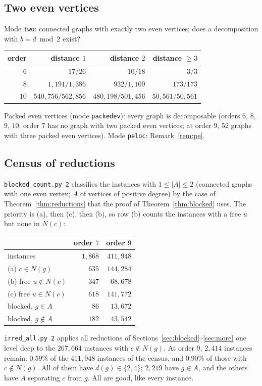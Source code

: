 \documentclass[11pt]{amsart}
\theoremstyle{definition}
\begin{document}
\subsection*{Two even vertices}
Mode \texttt{two}: connected graphs with exactly two even vertices; does a decomposition with
$b=d\bmod2$ exist?
\begin{center}
\begin{tabular}{rrrr}
\toprule
order & distance $1$ & distance $2$ & distance $\ge3$\\
\midrule
$6$ & $17/26$ & $10/18$ & $3/3$\\
$8$ & $1{,}191/1{,}386$ & $932/1{,}109$ & $173/173$\\
$10$ & $540{,}756/562{,}856$ & $480{,}198/501{,}456$ & $50{,}561/50{,}561$\\
\bottomrule
\end{tabular}
\end{center}
Packed even vertices (mode \texttt{packedev}): every graph is decomposable (orders $6$, $8$, $9$,
$10$; order $7$ has no graph with two packed even vertices; at order $9$, $52$ graphs with three
packed even vertices). Mode \texttt{peloc}: Remark~\ref{rem:pe}.

\subsection*{Census of reductions}
\texttt{blocked\_count.py~2} classifies the instances with $1\le|A|\le2$ (connected graphs with
one even vertex; $A$ of vertices of positive degree) by the case of Theorem~\ref{thm:reductions}
that the proof of Theorem~\ref{thm:blocked} uses. The priority is (a), then (c), then (b), so row (b)
counts the instances with a free $u$ but none in $N(c)$:
\begin{center}
\begin{tabular}{lrr}
\toprule
& order $7$ & order $9$\\
\midrule
instances & $1{,}868$ & $411{,}948$\\
(a) $c\in N(g)$ & $635$ & $144{,}284$\\
(b) free $u\notin N(c)$ & $347$ & $68{,}678$\\
(c) free $u\in N(c)$ & $618$ & $141{,}772$\\
blocked, $g\in A$ & $86$ & $13{,}672$\\
blocked, $g\notin A$ & $182$ & $43{,}542$\\
\bottomrule
\end{tabular}
\end{center}
\texttt{irred\_all.py~2} applies all reductions of Sections~\ref{sec:blocked}--\ref{sec:more} one
level deep to the $267{,}664$ instances with $c\notin N(g)$. At order $9$, $2{,}414$ instances
remain: $0.59\%$ of the $411{,}948$ instances of the census, and $0.90\%$ of those with $c\notin N(g)$.
All of them have $d(g)\in\{2,4\}$;
$2{,}219$ have $g\in A$, and the others have $A$ separating $c$ from $g$. All are good, like every
instance.
\end{document}
